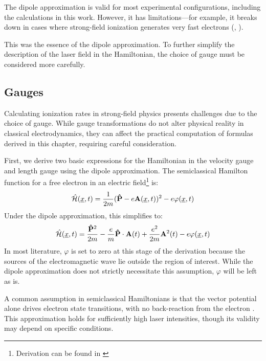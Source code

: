 The dipole approximation is valid for most experimental configurations, including the calculations in this work. 
However, it has limitations—for example, it breaks down in cases where strong-field ionization generates very fast electrons (\cite{bosmandipoleapprox}, \cite{breakdowndipoleapprox}).

This was the essence of the dipole approximation.
To further simplify the description of the laser field in the Hamiltonian, the choice of gauge must be considered more carefully.






\subsection{Gauges}
Calculating ionization rates in strong-field physics presents challenges due to the choice of gauge. While gauge transformations do not alter physical reality in classical electrodynamics, they can affect the practical computation of formulas derived in this chapter, requiring careful consideration.

First, we derive two basic expressions for the Hamiltonian in the velocity gauge and length gauge using the dipole approximation. 
The semiclassical Hamilton function for a free electron in an electric field\footnote{Derivation can be found in \cite{LandauLifschitzBand2}} is:%
\begin{equation}%
    \hat{\Hs}(\uvec{x}, t) = \frac{1}{2m}(\vec{\hat{P}} - e \vec{A}(\uvec{x}, t))^2 - e \varphi(\uvec{x}, t) \label{eq:semiClassicalHamilton}
\end{equation}
Under the dipole approximation, this simplifies to:
\begin{equation*}
    \hat{\mathcal{H}}(\underline{x}, t) = \frac{\mathbf{\hat{P}}^2}{2m} - \frac{e}{m}\mathbf{\hat{P}}\cdot \mathbf{A}(t) + \frac{e^2}{2m}\mathbf{A}^2(t) - e \varphi(\underline{x}, t)
\end{equation*}
In most literature, $\varphi$ is set to zero at this stage of the derivation because the sources of the electromagnetic wave lie outside the region of interest.
While the dipole approximation does not strictly necessitate this assumption, $\varphi$ will be left as is.

A common assumption in semiclassical Hamiltonians is that the vector potential alone drives electron state transitions, with no back-reaction from the electron \cite{bosmandipoleapprox}. 
This approximation holds for sufficiently high laser intensities, though its validity may depend on specific conditions.%

